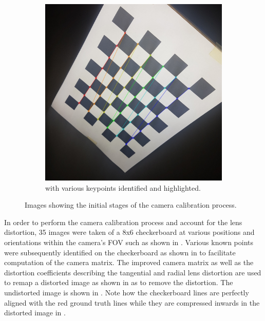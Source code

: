 \begin{figure}[H]
\begin{subfigure}[b]{0.45\textwidth}
         \includegraphics[width=\textwidth]{figures/202106/detected-checkerboard.jpg}
         \caption{ with various keypoints identified and highlighted.}
         \label{fig:detected-checkerboard}
    \end{subfigure}
    \captionsetup{singlelinecheck = false, justification=justified}
    \caption{Images showing the initial stages of the camera calibration process.}
    \label{fig:checkerboard-calibration}
\end{figure}

In order to perform the camera calibration process and account for the lens distortion, 35 images were taken of a 8x6 checkerboard at various positions and orientations within the camera's \ac{FOV} such as shown in . Various known points were subsequently identified on the checkerboard as shown in  to facilitate computation of the camera matrix. The improved camera matrix as well as the distortion coefficients describing the tangential and radial lens distortion are used to remap a distorted image as shown in  as to remove the distortion. The undistorted image is shown in . Note how the checkerboard lines are perfectly aligned with the red ground truth lines while they are compressed inwards in the distorted image in .

